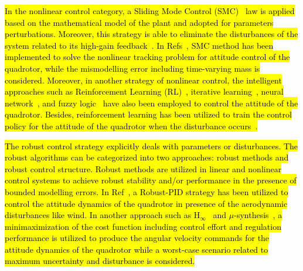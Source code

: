 \documentclass[3p]{elsarticle}
\begin{document}
\hl{In the nonlinear control category, a Sliding Mode Control (SMC)~\mbox{\cite{LABBADI2020290, MOFID2022455}} law is applied based on the mathematical model of the plant and adopted for parameters perturbations. Moreover, this strategy is able to eliminate the disturbances of the system related to its high-gain feedback~{\cite{YANG2021175}}. In Refs~{\cite{WU2022436}}, SMC method has been implemented to solve the nonlinear tracking problem for attitude control of the quadrotor, while the mismodelling error including time-varying mass is considered. Moreover, in another strategy of nonlinear control, the intelligent approaches such as Reinforcement Learning (RL)~\mbox{\cite{Hwangbo_2017, LIN2020135}}, iterative learning~{\cite{electronics10202474}}, neural network~{\cite{JIN202012241}}, and fuzzy logic~{\cite{GLIDA2022}} have also been employed to control the attitude of the quadrotor. Besides, reinforcement learning has been utilized to train the control policy for the attitude of the quadrotor when the disturbance occurs~{\cite{WANG2023222}}.}


\hl{The robust control strategy explicitly deals with parameters or disturbances. The robust algorithms can be categorized into two approaches: robust methods and robust control structure. Robust methods are utilized in linear and nonlinear control systems to achieve robust stability and/or performance in the presence of bounded modelling errors. In Ref~{\cite{MIRANDACOLORADO202047}}, a Robust-PID strategy has been utilized to control the attitude dynamics of the quadrotor in presence of the aerodynamic disturbances like wind. In another approach such as H$_{\infty}$~\mbox{\cite{WANG201910, REKABI202081}} and $\mu$-synthesis~{\cite{RODRIGUEZMARTINEZ2023739}}, a minimaximization of the cost function including control effort and regulation performance is utilized to produce the angular velocity commands for the attitude dynamics of the quadrotor while a worst-case scenario related to maximum uncertainty and disturbance is considered.}
\end{document}
